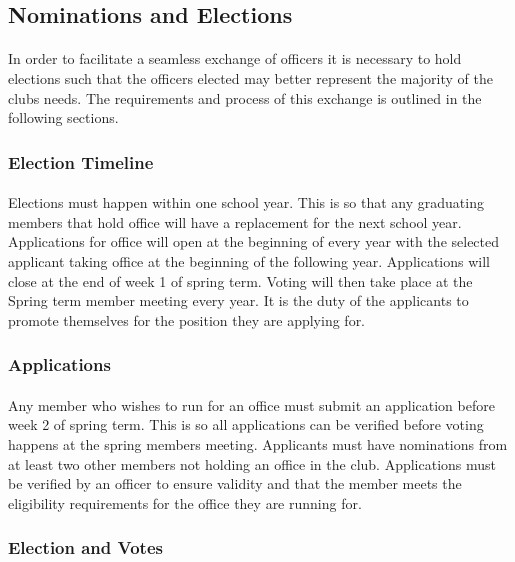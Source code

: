 \documentclass[12pt]{article}
\begin{document}
 
\subsection{Nominations and Elections}
\paragraph{}
In order to facilitate a seamless exchange of officers it is necessary to hold elections such that the officers elected may better represent the majority of the clubs needs. The requirements and process of this exchange is outlined in the following sections.

\subsubsection{Election Timeline}
\paragraph{}
Elections must happen within one school year. This is so that any graduating members that hold office will have a replacement for the next school year. Applications for office will open at the 
beginning of every year with the selected applicant taking office at the beginning of the following 
year. Applications will close at the end of week 1 of spring term. Voting will then take place at the Spring term member meeting every year.
It is the duty of the applicants to promote themselves for the position they are applying for. 

\subsubsection{Applications}
\paragraph{}
Any member who wishes to run for an office must submit an application before week 2 of spring term. 
This is so all applications can be verified before voting happens at the spring members meeting. 
Applicants must have nominations from at least two other members not holding an office in the club. 
Applications must be verified by an officer to ensure validity and that the member meets the eligibility requirements for the office they are running for.


\subsubsection{Election and Votes}
\end{document}
